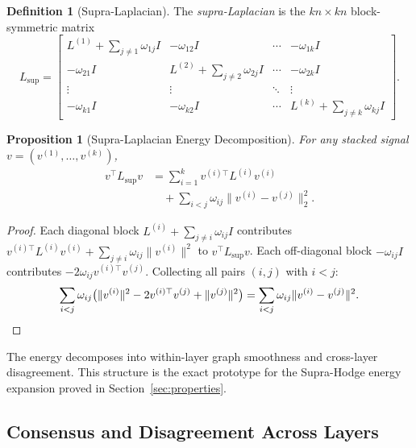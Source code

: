 \documentclass[11pt]{article}
\newtheorem{proposition}[theorem]{Proposition}
\theoremstyle{definition}
\newtheorem{definition}[theorem]{Definition}
\theoremstyle{remark}
\newcommand{\Lsup}{L_{\mathrm{sup}}}
\begin{document}
\begin{definition}[Supra-Laplacian]
The \emph{supra-Laplacian} is the $kn\times kn$ block-symmetric matrix
\begin{equation}
  \label{eq:supra}
  \Lsup =
  \begin{bmatrix}
    L^{(1)} + \textstyle\sum_{j\neq 1}\omega_{1j}I & -\omega_{12}I & \cdots & -\omega_{1k}I\\
    -\omega_{21}I & L^{(2)} + \textstyle\sum_{j\neq 2}\omega_{2j}I & \cdots & -\omega_{2k}I\\
    \vdots & \vdots & \ddots & \vdots\\
    -\omega_{k1}I & -\omega_{k2}I & \cdots & L^{(k)} + \textstyle\sum_{j\neq k}\omega_{kj}I
  \end{bmatrix}.
\end{equation}
\end{definition}

\begin{proposition}[Supra-Laplacian Energy Decomposition]
\label{prop:supra_energy}
For any stacked signal $v=(v^{(1)},\dots,v^{(k)})$,
\begingroup
\small
\[
  \begin{aligned}
    v^\top \Lsup v
    &= \sum_{i=1}^k v^{(i)\top} L^{(i)} v^{(i)} \\
    &\quad + \sum_{i<j}\omega_{ij}\|v^{(i)} - v^{(j)}\|_2^2.
  \end{aligned}
\]
\endgroup
\end{proposition}

\begin{proof}
Each diagonal block $L^{(i)}+\sum_{j\neq i}\omega_{ij}I$ contributes
$v^{(i)\top}L^{(i)}v^{(i)} + \sum_{j\neq i}\omega_{ij}\|v^{(i)}\|^2$ to
$v^\top\Lsup v$. Each off-diagonal block $-\omega_{ij}I$ contributes
$-2\omega_{ij}v^{(i)\top}v^{(j)}$. Collecting all pairs $(i,j)$ with $i<j$:
\[
  \sum_{i<j}\omega_{ij}\bigl(\|v^{(i)}\|^2 - 2v^{(i)\top}v^{(j)}
  + \|v^{(j)}\|^2\bigr)
  = \sum_{i<j}\omega_{ij}\|v^{(i)}-v^{(j)}\|^2. \qedhere
\]
\end{proof}

The energy decomposes into within-layer graph smoothness and cross-layer
disagreement. This structure is the exact prototype for the Supra-Hodge energy
expansion proved in Section~\ref{sec:properties}.

\subsection{Consensus and Disagreement Across Layers}
\end{document}
